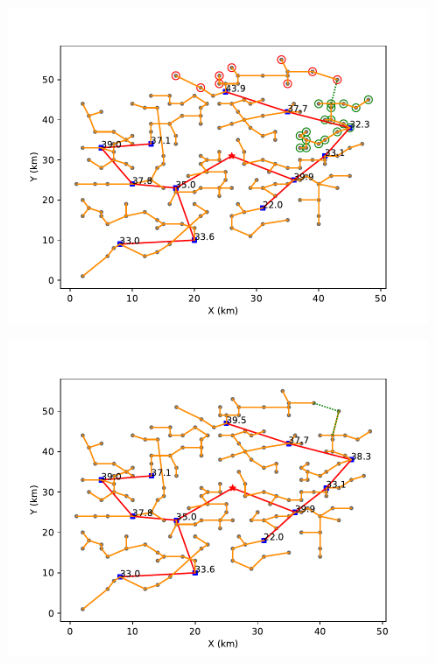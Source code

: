 \documentclass{cumcmthesis}
\begin{document}
  \begin{figure}[!h]
    \centering
    \begin{minipage}[c]{0.45\textwidth}
        \centering
        \includegraphics[width=0.99\textwidth]{figure/pipline_graft_connection_7.pdf}
        \label{fig:pipline_graft_connection_7}
    \end{minipage}
    \begin{minipage}[c]{0.45\textwidth}
        \centering
        \includegraphics[width=0.99\textwidth]{figure/pipline_graft_cut_7.pdf}
        \label{fig:pipline_graft_cut_7}
    \end{minipage}
  \end{figure}
\end{document}
